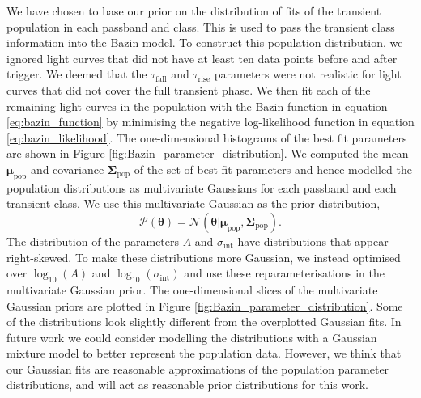 \documentclass[fleqn,usenatbib]{mnras}
\begin{document}
We have chosen to base our prior on the distribution of fits of the transient population in each passband and class. This is used to pass the transient class information into the Bazin model. To construct this population distribution, we ignored light curves that did not have at least ten data points before and after trigger. We deemed that the $\tau_{\mathrm{fall}}$ and $\tau_{\mathrm{rise}}$ parameters were not realistic for light curves that did not cover the full transient phase. We then fit each of the remaining light curves in the population with the Bazin function in equation \ref{eq:bazin_function} by minimising the negative log-likelihood function in equation \ref{eq:bazin_likelihood}. The one-dimensional histograms of the best fit parameters are shown in Figure \ref{fig:Bazin_parameter_distribution}. We computed the mean $\bm{\mu}_{\mathrm{pop}}$ and covariance $\bm{\Sigma}_{\mathrm{pop}}$ of the set of best fit parameters and hence modelled the population distributions as multivariate Gaussians for each passband and each transient class. We use this multivariate Gaussian as the prior distribution,
\begin{equation}
    \mathcal{P}(\bm{\theta}) = \mathcal{N} \left(\bm{\theta} | \bm{\mu}_{\mathrm{pop}}, \bm{\Sigma}_{\mathrm{pop}}  \right).
\label{eq:Gaussian_prior}
\end{equation}
The distribution of the parameters $A$ and $\sigma_{\mathrm{int}}$ have distributions that appear right-skewed. To make these distributions more Gaussian, we instead optimised over $\log_{10}{(A)}$ and $\log_{10}{(\sigma_{\mathrm{int}})}$ and use these reparameterisations in the multivariate Gaussian prior. The one-dimensional slices of the multivariate Gaussian priors are plotted in Figure \ref{fig:Bazin_parameter_distribution}. Some of the distributions look slightly different from the overplotted Gaussian fits. In future work we could consider modelling the distributions with a Gaussian mixture model to better represent the population data. However, we think that our Gaussian fits are reasonable approximations of the population parameter distributions, and will act as reasonable prior distributions for this work.
\end{document}
